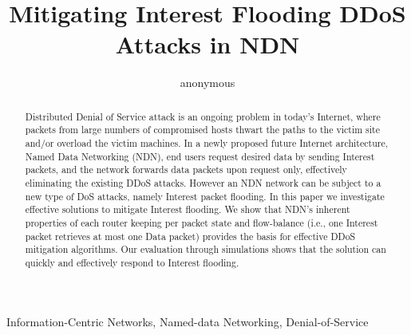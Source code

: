 \documentclass[conference]{IEEEtran}
\title{Mitigating Interest Flooding DDoS Attacks in NDN}%
\author{anonymous}
\begin{document}
\maketitle

\begin{abstract}
Distributed Denial of Service attack is an ongoing problem in today's Internet, where packets from large numbers of compromised hosts thwart the paths to the victim site and/or overload the victim machines. 
In a newly proposed future Internet architecture, Named Data Networking (NDN), end users request desired data by sending Interest packets, and the network forwards data packets upon request only, effectively eliminating the existing DDoS attacks. 
However an NDN network can be subject to a new type of DoS attacks, namely Interest packet flooding.  
In this paper we investigate effective solutions to mitigate Interest flooding.
We show that NDN's inherent properties of each router keeping per packet state and flow-balance (i.e., one Interest packet retrieves at most one Data packet) provides the  basis for effective DDoS mitigation algorithms.
Our evaluation through simulations shows that the solution can quickly and effectively respond to Interest flooding.
\end{abstract}

\begin{IEEEkeywords}
Information-Centric Networks, Named-data Networking, Denial-of-Service
\end{IEEEkeywords}






















\end{document}
